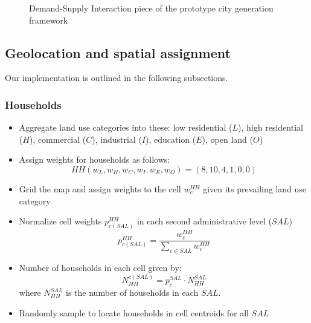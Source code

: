 \documentclass[11pt,twoside]{article}
\numberwithin{equation}{section}
\newcommand{\?}{\stackrel{?}{=}}
\newcommand{\fr}{\frac}
\begin{document}
\begin{figure}[h!]
  \caption{Demand-Supply Interaction piece of the prototype city generation framework}
  \label{fig:framework}
\end{figure}



\subsection{Geolocation and spatial assignment}
Our implementation is outlined in the following subsections.


\subsubsection{Households}
\begin{itemize}
  \item Aggregate land use categories into these: low residential ($L$), high residential ($H$), commercial ($C$), industrial ($I$), education ($E$), open land ($O$)
  \item Assign weights for households as follows:
    \begin{equation}
     HH (w_L, w_H, w_C, w_I, w_E, w_O) = (8, 10, 4, 1, 0, 0)
    \end{equation}
  \item Grid the map and assign weights to the cell $w_c^{HH}$ given its  prevailing land use category
  \item Normalize cell weights $p_{c(SAL)}^{HH}$ in each second administrative level ($SAL$)
    \begin{equation}
      p_{c(SAL)}^{HH} = \fr{w_c^{HH}}{\sum_{c \in SAL} w_c^{HH}}
    \end{equation}
  \item Number of households in each cell given by:
    \begin{equation}
     N_{HH}^{c(SAL)} = p_c^{SAL}\cdot N_{HH}^{SAL}
    \end{equation}
    where $ N_{HH}^{SAL}$ is the number of households in each $SAL$.
  \item Randomly sample to locate households in cell centroids for all $SAL$
  \end{itemize}
\end{document}

